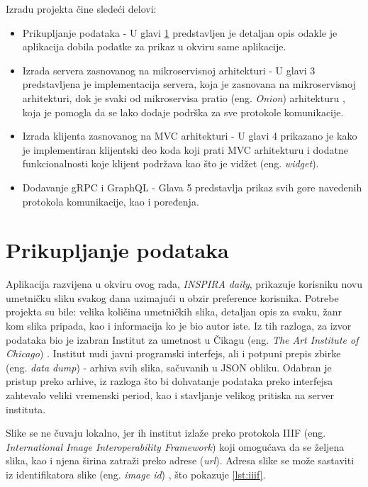 \documentclass[12pt,oneside]{memoir}
\begin{document}
 Izradu projekta čine sledeći delovi: 
 \begin{itemize}
\item Prikupljanje podataka - U glavi \ref{ch:podaci} predstavljen je detaljan opis odakle je aplikacija dobila podatke za prikaz u okviru same aplikacije.
\item Izrada servera zasnovanog na mikroservisnoj arhitekturi \cite{newman2021} - U glavi 3 predstavljena je implementacija servera, koja je zasnovana na mikroservisnoj arhitekturi, dok je svaki od mikroservisa pratio (eng. \textit{Onion}) arhitekturu \cite{palermo2008, martin2017}, koja je pomogla da se lako dodaje podrška za sve protokole komunikacije. 
\item Izrada klijenta zasnovanog na MVC arhitekturi \cite{fowler-mvc} - U glavi 4 prikazano je kako je implementiran klijentski deo koda koji prati MVC arhitekturu i dodatne funkcionalnosti koje klijent podržava kao što je vidžet (eng. \textit{widget}).
\item Dodavanje gRPC i GraphQL - Glava 5 predstavlja prikaz svih gore navedenih protokola komunikacije, kao i poređenja.
\end{itemize}

  
\chapter{Prikupljanje podataka}
\label{ch:podaci}

Aplikacija razvijena u okviru ovog rada, {\textit{INSPIRA daily}\xspace}, prikazuje korisniku novu umetničku sliku svakog dana
uzimajući u obzir preference korisnika. Potrebe projekta su bile: velika količina umetničkih slika, detaljan opis
za svaku, žanr kom slika pripada, kao i informacija ko je bio autor iste. Iz tih razloga, za izvor 
podataka bio je izabran Institut za umetnost u Čikagu (eng. \textit{The Art Institute of Chicago}) 
\cite{artic-api}. Institut
nudi javni programski interfejs, ali i potpuni prepis zbirke (eng. \textit{data dump}) - arhiva svih slika, 
sačuvanih u JSON obliku. Odabran je pristup preko arhive, iz razloga što bi dohvatanje podataka preko
interfejsa zahtevalo veliki vremenski period, kao i stavljanje velikog pritiska na server instituta. 


Slike se ne čuvaju lokalno, jer ih institut izlaže preko protokola IIIF 
(eng. \textit{International Image Interoperability Framework}) koji omogućava da se željena slika, kao 
i njena širina zatraži preko adrese (\textit{url}). Adresa slike se može sastaviti iz identifikatora 
slike (eng. \textit{image id}) , što pokazuje 
\autoref{lst:iiif}.
\end{document}
